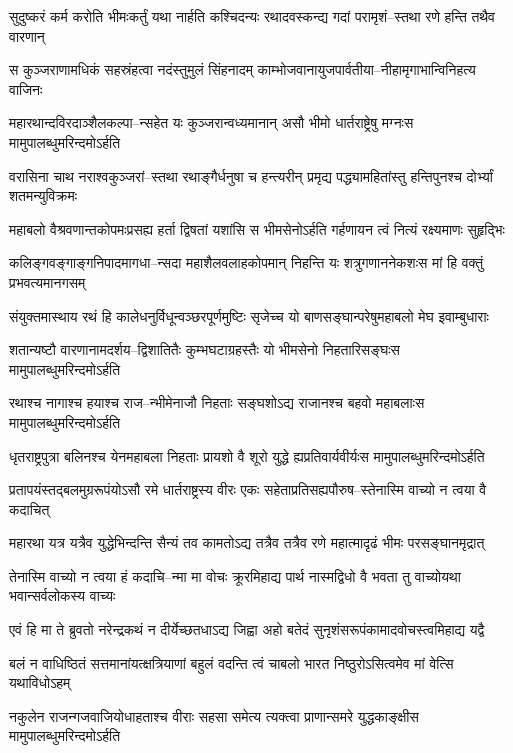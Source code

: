 \twolineshloka
{सुदुष्करं कर्म करोति भीमःकर्तुं यथा नार्हति कश्चिदन्यः}
{रथादवस्कन्द्य गदां परामृशं--स्तथा रणे हन्ति तथैव वारणान्}


\twolineshloka
{स कुञ्जराणामधिकं सहस्रंहत्वा नदंस्तुमुलं सिंहनादम्}
{काम्भोजवानायुजपार्वतीया--नीहामृगाभान्विनिहत्य वाजिनः}


\twolineshloka
{महारथान्दविरदाञ्शैलकल्पा--न्सहेत यः कुञ्जरान्वध्यमानान्}
{असौ भीमो धार्तराष्ट्रेषु मग्नःस मामुपालब्धुमरिन्दमोऽर्हति}


\twolineshloka
{वरासिना चाथ नराश्वकुञ्जरां--स्तथा रथाङ्गैर्धनुषा च हन्त्यरीन्}
{प्रमृद्य पद्ध्यामहितांस्तु हन्तिपुनश्च दोर्भ्यां शतमन्युविक्रमः}


\twolineshloka
{महाबलो वैश्रवणान्तकोपमःप्रसह्य हर्ता द्विषतां यशांसि}
{स भीमसेनोऽर्हति गर्हणायन त्वं नित्यं रक्ष्यमाणः सुहृद्भिः}


\twolineshloka
{कलिङ्गवङ्गाङ्गनिपादमागधा--न्सदा महाशैलवलाहकोपमान्}
{निहन्ति यः शत्रुगणाननेकशःस मां हि वक्तुं प्रभवत्यमानगसम्}


\twolineshloka
{संयुक्तमास्थाय रथं हि कालेधनुर्विधून्वञ्छरपूर्णमुष्टिः}
{सृजेच्च यो बाणसङ्घान्परेषुमहाबलो मेघ इवाम्बुधाराः}


\twolineshloka
{शतान्यष्टौ वारणानामदर्शय--द्विशातितैः कुम्भघटाग्रहस्तैः}
{यो भीमसेनो निहतारिसङ्घःस मामुपालब्धुमरिन्दमोऽर्हति}


\twolineshloka
{रथाश्च नागाश्च हयाश्च राज--न्भीमेनाजौ निहताः सङ्घशोऽद्य}
{राजानश्च बहवो महाबलाःस मामुपालब्धुमरिन्दमोऽर्हति}


\twolineshloka
{धृतराष्ट्रपुत्रा बलिनश्च येनमहाबला निहताः प्रायशो वै}
{शूरो युद्धे ह्यप्रतिवार्यवीर्यःस मामुपालब्धुमरिन्दमोऽर्हति}


\twolineshloka
{प्रतापयंस्तद्बलमुग्ररूपंयोऽसौ रमे धार्तराष्ट्रस्य वीरः}
{एकः सहेताप्रतिसह्यपौरुष--स्तेनास्मि वाच्यो न त्वया वै कदाचित्}


\twolineshloka
{महारथा यत्र यत्रैव युद्धेभिन्दन्ति सैन्यं तव कामतोऽद्य}
{तत्रैव तत्रैव रणे महात्मादृढं भीमः परसङ्घानमृद्रात्}


\twolineshloka
{तेनास्मि वाच्यो न त्वया हं कदाचि--न्मा मा वोचः क्रूरमिहाद्य पार्थ}
{नास्मद्विधो वै भवता तु वाच्योयथा भवान्सर्वलोकस्य वाच्यः}


\twolineshloka
{एवं हि मा ते ब्रुवतो नरेन्द्रकथं न दीर्येच्छतधाऽद्य जिह्वा}
{अहो बतेदं सुनृशंसरूपंकामादवोचस्त्वमिहाद्य यद्वै}


\twolineshloka
{बलं न वाधिष्ठितं सत्तमानांयत्क्षत्रियाणां बहुलं वदन्ति}
{त्वं चाबलो भारत निष्ठुरोऽसित्वमेव मां वेत्सि यथाविधोऽहम्}


\twolineshloka
{नकुलेन राजन्गजवाजियोधाहताश्च वीराः सहसा समेत्य}
{त्यक्त्वा प्राणान्समरे युद्धकाङ्क्षीस मामुपालब्धुमरिन्दमोऽर्हति}


